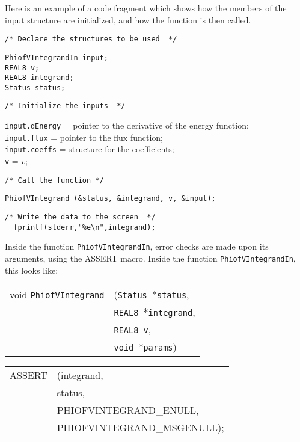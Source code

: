 \documentclass[12pt]{article}
\begin{document}
Here is an example of a code fragment which shows how the members of the input structure are initialized, and how the function is then called.

\vspace{5mm}

\noindent
\begin{verbatim}
/* Declare the structures to be used  */
\end{verbatim}
\texttt{PhiofVIntegrandIn input;} \\
\texttt{REAL8 v;} \\
\texttt{REAL8 integrand;} \\
\texttt{Status status;} \\
\begin{verbatim}
/* Initialize the inputs  */
\end{verbatim}
\texttt{input.dEnergy} = pointer to the derivative of the energy function; \\
\texttt{input.flux} = pointer to the flux function; \\
\texttt{input.coeffs} = structure for the coefficients; \\
\texttt{v} = $v$;
\begin{verbatim}
/* Call the function */
\end{verbatim}
\texttt{PhiofVIntegrand (\&status, \&integrand, v, \&input);}
\begin{verbatim}
/* Write the data to the screen  */
  fprintf(stderr,"%e\n",integrand); 
\end{verbatim}

Inside the function \texttt{PhiofVIntegrandIn}, error checks are made upon its arguments, using the ASSERT macro. Inside the function \texttt{PhiofVIntegrandIn}, this looks like:

\vspace{5mm}

\begin{tabular}{ll}
void \texttt{PhiofVIntegrand}&(\texttt{Status $\ast$status},     \\
                                   &\texttt{REAL8 $\ast$integrand}, \\
                                   &\texttt{REAL8 v}, \\
                                   &\texttt{void $\ast$params})
\end{tabular}

\vspace{5mm}

\begin{tabular}{ll}
ASSERT & (integrand,  \\
       &  status,    \\
       &  PHIOFVINTEGRAND\_ENULL, \\
       &  PHIOFVINTEGRAND\_MSGENULL);
\end{tabular}
\end{document}
